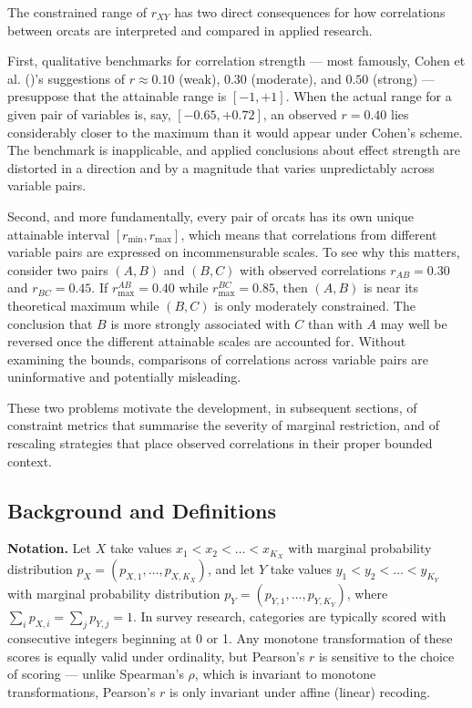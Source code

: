 \documentclass[
  12pt,
]{article}
\theoremstyle{plain}
\theoremstyle{definition}
\theoremstyle{remark}
\begin{document}
The constrained range of \(r_{XY}\) has two direct consequences for how
correlations between orcats are interpreted and compared in applied
research.

First, qualitative benchmarks for correlation strength --- most
famously, Cohen et al. ()'s
suggestions of \(r \approx 0.10\) (weak), \(0.30\) (moderate), and
\(0.50\) (strong) --- presuppose that the attainable range is
\([-1, +1]\). When the actual range for a given pair of variables is,
say, \([-0.65, +0.72]\), an observed \(r = 0.40\) lies considerably
closer to the maximum than it would appear under Cohen's scheme. The
benchmark is inapplicable, and applied conclusions about effect strength
are distorted in a direction and by a magnitude that varies
unpredictably across variable pairs.

Second, and more fundamentally, every pair of orcats has its own unique
attainable interval \([r_{\min}, r_{\max}]\), which means that
correlations from different variable pairs are expressed on
incommensurable scales. To see why this matters, consider two pairs
\((A,B)\) and \((B,C)\) with observed correlations \(r_{AB} = 0.30\) and
\(r_{BC} = 0.45\). If \(r_{\max}^{AB} = 0.40\) while
\(r_{\max}^{BC} = 0.85\), then \((A,B)\) is near its theoretical maximum
while \((B,C)\) is only moderately constrained. The conclusion that
\(B\) is more strongly associated with \(C\) than with \(A\) may well be
reversed once the different attainable scales are accounted for. Without
examining the bounds, comparisons of correlations across variable pairs
are uninformative and potentially misleading.

These two problems motivate the development, in subsequent sections, of
constraint metrics that summarise the severity of marginal restriction,
and of rescaling strategies that place observed correlations in their
proper bounded context.

\subsection{Background and
Definitions}\label{background-and-definitions}

\textbf{Notation.} Let \(X\) take values \(x_1 < x_2 < \dots < x_{K_X}\)
with marginal probability distribution
\(p_X = (p_{X,1}, \dots, p_{X,K_X})\), and let \(Y\) take values
\(y_1 < y_2 < \dots < y_{K_Y}\) with marginal probability distribution
\(p_Y = (p_{Y,1}, \dots, p_{Y,K_Y})\), where
\(\sum_i p_{X,i} = \sum_j p_{Y,j} = 1\). In survey research, categories
are typically scored with consecutive integers beginning at 0 or 1. Any
monotone transformation of these scores is equally valid under
ordinality, but Pearson's \(r\) is sensitive to the choice of scoring
--- unlike Spearman's \(\rho\), which is invariant to monotone
transformations, Pearson's \(r\) is only invariant under affine (linear)
recoding.
\end{document}
